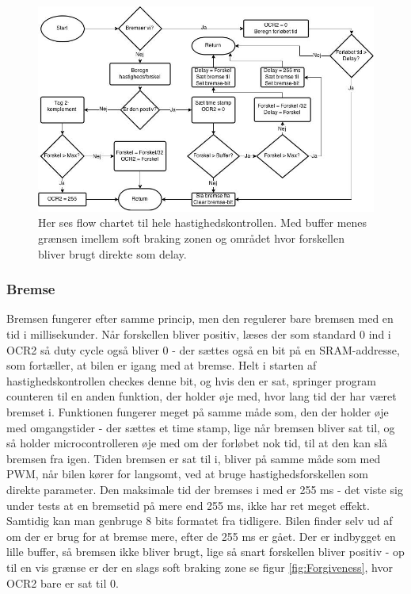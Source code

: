 \begin{figure}[hpt]

	\centering
		\includegraphics[scale=0.4]{Billeder/Speed.jpg}
	\caption{Her ses flow chartet til hele hastighedskontrollen. Med buffer menes grænsen imellem soft braking zonen og området hvor forskellen bliver brugt direkte som delay.}
	\label{fig:Speed}
	
\end{figure}


\subsubsection{Bremse}
Bremsen fungerer efter samme princip, men den regulerer bare bremsen med en tid i millisekunder. Når forskellen bliver positiv, læses der som standard 0 ind i OCR2 så duty cycle også bliver 0 - der sættes også en bit på en SRAM-addresse, som fortæller, at bilen er igang med at bremse. Helt i starten af hastighedskontrollen checkes denne bit, og hvis den er sat, springer program counteren til en anden funktion, der holder øje med, hvor lang tid der har været bremset i. Funktionen fungerer meget på samme måde som, den der holder øje med omgangstider - der sættes et time stamp, lige når bremsen bliver sat til, og så holder microcontrolleren øje med om der forløbet nok tid, til at den kan slå bremsen fra igen. Tiden bremsen er sat til i, bliver på samme måde som med PWM, når bilen kører for langsomt, ved at bruge hastighedsforskellen som direkte parameter. Den maksimale tid der bremses i med er 255 ms - det viste sig under tests at en bremsetid på mere end 255 ms, ikke har ret meget effekt. Samtidig kan man genbruge 8 bits formatet fra tidligere. Bilen finder selv ud af om der er brug for at bremse mere, efter de 255 ms er gået. Der er indbygget en lille buffer, så bremsen ikke bliver brugt, lige så snart forskellen bliver positiv - op til en vis grænse er der en slags soft braking zone se figur \ref{fig:Forgiveness}, hvor OCR2 bare er sat til 0. 
